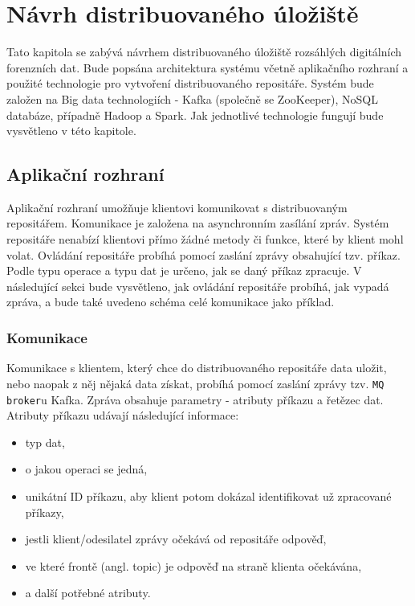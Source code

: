 \chapter{Návrh distribuovaného úložiště} \label{distrRepDesignChapter}
Tato kapitola se zabývá návrhem distribuovaného úložiště rozsáhlých digitálních forenzních dat. Bude popsána architektura systému včetně aplikačního rozhraní a použité technologie pro vytvoření distribuovaného repositáře.
Systém bude založen na Big data technologiích - Kafka (společně se ZooKeeper), NoSQL databáze, případně Hadoop a Spark. Jak jednotlivé technologie fungují bude vysvětleno v této kapitole.

\section{Aplikační rozhraní}
Aplikační rozhraní umožňuje klientovi komunikovat s distribuovaným repositářem. Komunikace je založena na asynchronním zasílání zpráv. Systém repositáře nenabízí klientovi přímo žádné metody či funkce, které by klient mohl volat. Ovládání repositáře probíhá pomocí zaslání zprávy obsahující tzv. příkaz. Podle typu operace a typu dat je určeno, jak se daný příkaz zpracuje. V následující sekci bude vysvětleno, jak ovládání repositáře probíhá, jak vypadá zpráva, a bude také uvedeno schéma celé komunikace jako příklad.

\subsection{Komunikace}
Komunikace s klientem, který chce do distribuovaného repositáře data uložit, nebo naopak z něj nějaká data získat, probíhá pomocí zaslání zprávy tzv. \texttt{MQ broker}u Kafka. Zpráva obsahuje parametry - atributy příkazu a řetězec dat. Atributy příkazu udávají následující informace:

\begin{itemize}
    \item typ dat,
    \item o jakou operaci se jedná,
    \item unikátní ID příkazu, aby klient potom dokázal identifikovat už zpracované příkazy,
    \item jestli klient/odesilatel zprávy očekává od repositáře odpověď,
    \item ve které frontě (angl. topic) je odpověď na straně klienta očekávána,
    \item a další potřebné atributy.
\end{itemize}

